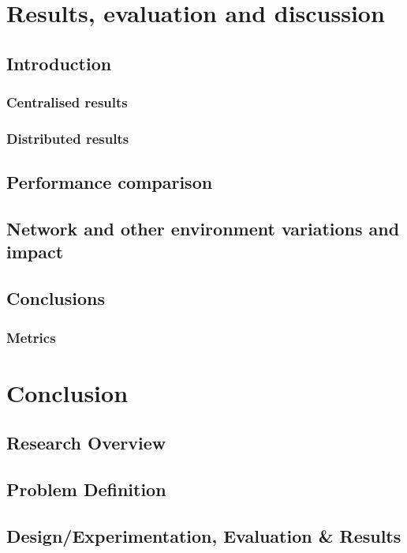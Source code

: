 \documentclass[oneside,12pt]{book}
\begin{document}
\chapter{Results, evaluation and discussion}
\section{Introduction}

\subsection{Centralised results}

\subsection{Distributed results}

\section{Performance comparison}

\section{Network and other environment variations and impact}

\section{Conclusions}

\subsection{Metrics}



\chapter{Conclusion}
\section{Research Overview}
\section{Problem Definition}
\section{Design/Experimentation, Evaluation \& Results}
\end{document}
